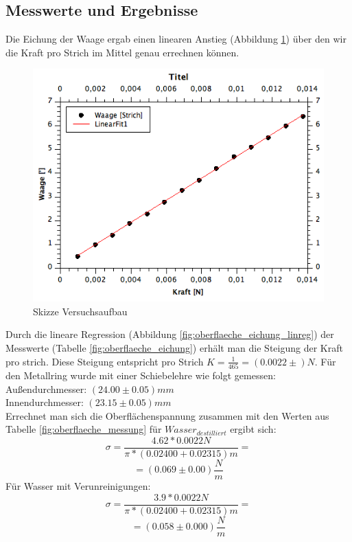 \documentclass[12pt,a4paper]{article}
\begin{document}
\begin{multicols}{2}
\subsection{Messwerte und Ergebnisse}
Die Eichung der Waage ergab einen linearen Anstieg (Abbildung \ref{fig:oberflaeche_eichung_fit}) über den wir die Kraft pro Strich im Mittel genau errechnen können.
\begin{figure}[H]
	\centering
	\includegraphics[scale=0.45]{./figure/Waageneichung-Fit.png}
	\caption{Skizze Versuchsaufbau}
	\label{fig:oberflaeche_eichung_fit}
\end{figure}
\noindent
Durch die lineare Regression (Abbildung \ref{fig:oberflaeche_eichung_linreg}) der Messwerte (Tabelle \ref{fig:oberflaeche_eichung}) erhält man die Steigung der Kraft pro strich. Diese Steigung entspricht pro Strich \textbf{$K = \frac{1}{465} = (0.0022\pm )N$}. Für den Metallring wurde mit einer Schiebelehre wie folgt gemessen:\\
Außendurchmesser: $(24.00 \pm 0.05)mm$\\
Innendurchmesser: $(23.15 \pm 0.05)mm$\\
Errechnet man sich die Oberflächenspannung zusammen mit den Werten aus Tabelle \ref{fig:oberflaeche_messung} für $Wasser_{destilliert}$ ergibt sich:
$$\sigma = \frac{4.62 * 0.0022N}{\pi * (0.02400 + 0.02315)m} =$$ 
$$= (0.069 \pm 0.00) \frac{N}{m}$$ %
Für Wasser mit Verunreinigungen: 
$$ \sigma = \frac{3.9 * 0.0022N}{\pi * (0.02400 + 0.02315)m} =$$
$$ = (0.058 \pm 0.000) \frac{N}{m}$$


\end{multicols}
\end{document}
